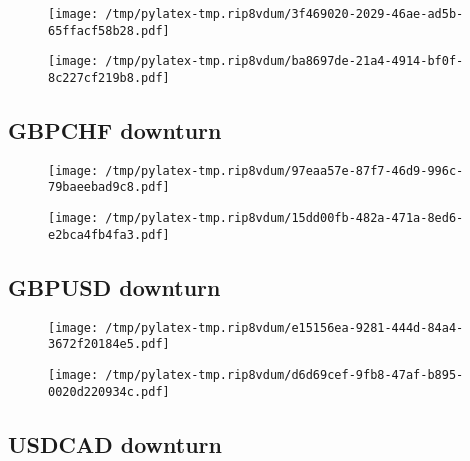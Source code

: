 \documentclass{article}%
\begin{document}
\begin{figure}[htbp]%
\centering%
\texttt{[image: /tmp/pylatex-tmp.rip8vdum/3f469020-2029-46ae-ad5b-65ffacf58b28.pdf]}%
\end{figure}

%


\begin{figure}[htbp]%
\centering%
\texttt{[image: /tmp/pylatex-tmp.rip8vdum/ba8697de-21a4-4914-bf0f-8c227cf219b8.pdf]}%
\end{figure}

%
\newpage %
\subsection{GBPCHF downturn}%
\label{subsec:GBPCHFdownturn}%


\begin{figure}[htbp]%
\centering%
\texttt{[image: /tmp/pylatex-tmp.rip8vdum/97eaa57e-87f7-46d9-996c-79baeebad9c8.pdf]}%
\end{figure}

%


\begin{figure}[htbp]%
\centering%
\texttt{[image: /tmp/pylatex-tmp.rip8vdum/15dd00fb-482a-471a-8ed6-e2bca4fb4fa3.pdf]}%
\end{figure}

%
\newpage %
\subsection{GBPUSD downturn}%
\label{subsec:GBPUSDdownturn}%


\begin{figure}[htbp]%
\centering%
\texttt{[image: /tmp/pylatex-tmp.rip8vdum/e15156ea-9281-444d-84a4-3672f20184e5.pdf]}%
\end{figure}

%


\begin{figure}[htbp]%
\centering%
\texttt{[image: /tmp/pylatex-tmp.rip8vdum/d6d69cef-9fb8-47af-b895-0020d220934c.pdf]}%
\end{figure}

%
\newpage %
\subsection{USDCAD downturn}%
\label{subsec:USDCADdownturn}%
\end{document}
